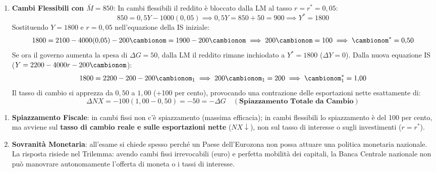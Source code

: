\begin{esercizio}
\begin{enumerate}
    \item \textbf{Cambi Flessibili con $\bar{M} = 850$}:
    In cambi flessibili il reddito è bloccato dalla LM al tasso $r = r^* = 0{,}05$:
    \begin{equation*}
        850 = 0{,}5 Y - 1000(0{,}05) \implies 0{,}5 Y = 850 + 50 = 900 \implies Y^* = 1800
    \end{equation*}
    Sostituendo $Y = 1800$ e $r = 0{,}05$ nell'equazione della IS iniziale:
    \begin{equation*}
        1800 = 2100 - 4000(0{,}05) - 200 \cambionom = 1900 - 200 \cambionom \implies 200 \cambionom = 100 \implies \cambionom^* = 0{,}50
    \end{equation*}
    Se ora il governo aumenta la spesa di $\Delta G = 50$, dalla LM il reddito rimane inchiodato a $Y^* = 1800$ ($\Delta Y = 0$).
    Dalla nuova equazione IS ($Y = 2200 - 4000 r - 200 \cambionom$):
    \begin{equation*}
        1800 = 2200 - 200 - 200 \cambionom_1 \implies 200 \cambionom_1 = 200 \implies \cambionom_1^* = 1{,}00
    \end{equation*}
    Il tasso di cambio si apprezza da $0{,}50$ a $1{,}00$ (+100 per cento), provocando una contrazione delle esportazioni nette esattamente di:
    \begin{equation*}
        \Delta NX = -100(1{,}00 - 0{,}50) = -50 = -\Delta G \quad (\textbf{Spiazzamento Totale da Cambio})
    \end{equation*}
\end{enumerate}
\end{esercizio}

\begin{esame}
\begin{enumerate}
    \item \textbf{Spiazzamento Fiscale}: in cambi fissi non c'è spiazzamento (massima efficacia); in cambi flessibili lo spiazzamento è del 100 per cento, ma avviene sul \textbf{tasso di cambio reale e sulle esportazioni nette} ($NX \downarrow$), non sul tasso di interesse o sugli investimenti ($r = r^*$).
    \item \textbf{Sovranità Monetaria}: all'esame si chiede spesso perché un Paese dell'Eurozona non possa attuare una politica monetaria nazionale. La risposta risiede nel Trilemma: avendo cambi fissi irrevocabili (euro) e perfetta mobilità dei capitali, la Banca Centrale nazionale non può manovrare autonomamente l'offerta di moneta o i tassi di interesse.
\end{enumerate}
\end{esame}
